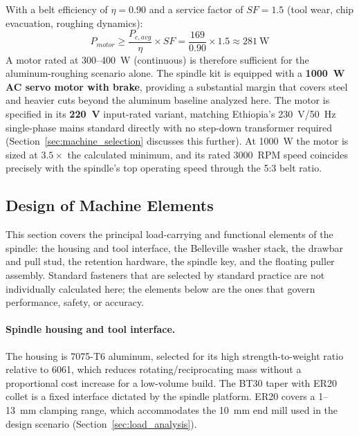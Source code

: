 \documentclass[12pt,a4paper]{report}
\begin{document}
	With a belt efficiency of $\eta = 0.90$ and a service factor of $SF = 1.5$ (tool wear,
	chip evacuation, roughing dynamics):
	\begin{equation}
		P_{motor} \geq \frac{P_{c,avg}}{\eta}\times SF = \frac{169}{0.90}\times 1.5 \approx 281~\text{W}
	\end{equation}
	A motor rated at 300--400~W (continuous) is therefore sufficient for the aluminum-roughing
	scenario alone. The spindle kit is equipped with a \textbf{1000~W AC servo motor with
		brake}, providing a substantial margin that covers steel and heavier cuts beyond the
	aluminum baseline analyzed here. The motor is specified in its \textbf{220~V} input-rated
	variant, matching Ethiopia's 230~V/50~Hz single-phase mains standard directly with no
	step-down transformer required (Section~\ref{sec:machine_selection} discusses this further). At 1000~W the motor
	is sized at $3.5\times$ the calculated minimum, and its rated 3000~RPM speed coincides
	precisely with the spindle's top operating speed through the 5:3 belt ratio.
	
	\subsection{Design of Machine Elements}\label{sec:machine_elements}
	This section covers the principal load-carrying and functional elements of the spindle: the
	housing and tool interface, the Belleville washer stack, the drawbar and pull stud, the
	retention hardware, the spindle key, and the floating puller assembly. Standard fasteners
	that are selected by standard practice are not individually calculated here; the elements
	below are the ones that govern performance, safety, or accuracy.
	
	\paragraph{Spindle housing and tool interface.} The housing is 7075-T6 aluminum,
	selected for its high strength-to-weight ratio relative to 6061, which reduces
	rotating/reciprocating mass without a proportional cost increase for a low-volume build.
	The BT30 taper with ER20 collet is a fixed interface dictated by the spindle platform.
	ER20 covers a 1--13~mm clamping range, which accommodates the 10~mm end mill used in the
	design scenario (Section~\ref{sec:load_analysis}).
	
\end{document}
